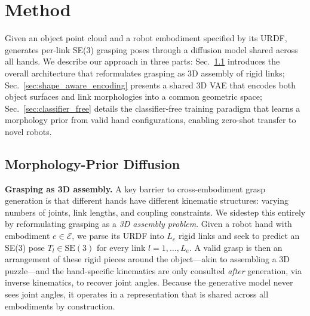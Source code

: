 
\section{Method}
\label{sec:method}

Given an object point cloud and a robot embodiment specified by its URDF, \modelname generates per-link SE(3) grasping poses through a diffusion model shared across all hands.
We describe our approach in three parts:
Sec.~\ref{sec:morphology_prior_diffusion} introduces the overall architecture that reformulates grasping as 3D assembly of rigid links;
Sec.~\ref{sec:shape_aware_encoding} presents a shared 3D VAE that encodes both object surfaces and link morphologies into a common geometric space;
Sec.~\ref{sec:classifier_free} details the classifier-free training paradigm that learns a morphology prior from valid hand configurations, enabling zero-shot transfer to novel robots.

\subsection{Morphology-Prior Diffusion}
\label{sec:morphology_prior_diffusion}

\noindent\textbf{Grasping as 3D assembly.}
A key barrier to cross-embodiment grasp generation is that different hands have different kinematic structures: varying numbers of joints, link lengths, and coupling constraints.
We sidestep this entirely by reformulating grasping as a \emph{3D assembly problem}.
Given a robot hand with embodiment $e \in \mathcal{E}$, we parse its URDF into $L_e$ rigid links and seek to predict an SE(3) pose $T_l \in \mathrm{SE}(3)$ for every link $l = 1, \dots, L_e$.
A valid grasp is then an arrangement of these rigid pieces around the object---akin to assembling a 3D puzzle---and the hand-specific kinematics are only consulted \emph{after} generation, via inverse kinematics, to recover joint angles.
Because the generative model never sees joint angles, it operates in a representation that is shared across all embodiments by construction.

